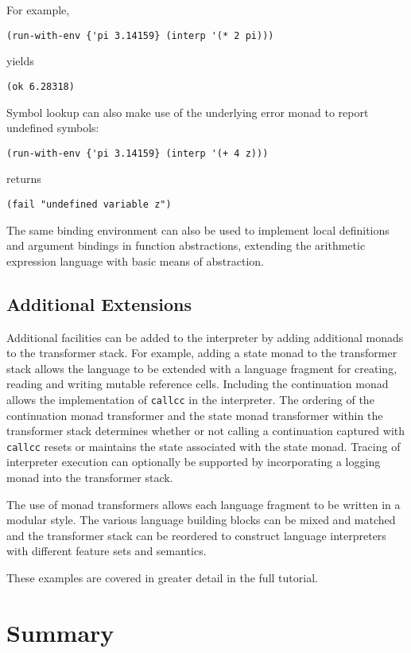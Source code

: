 \documentclass[natbib,10pt]{sigplanconf}
\begin{document}
\pagebreak

For example,
\begin{verbatim}
(run-with-env {'pi 3.14159} (interp '(* 2 pi)))
\end{verbatim}
yields
\begin{verbatim}
(ok 6.28318)
\end{verbatim}
Symbol lookup can also make use of the underlying error monad
to report undefined symbols:
\begin{verbatim}
(run-with-env {'pi 3.14159} (interp '(+ 4 z)))
\end{verbatim}
returns
\begin{verbatim}
(fail "undefined variable z")
\end{verbatim}

The same binding environment can also be used to implement local
definitions and argument bindings in function abstractions, extending
the arithmetic expression language with basic means of abstraction.

\subsection{Additional Extensions}

Additional facilities can be added to the interpreter by adding
additional monads to the transformer stack. For example, adding a
state monad to the transformer stack allows the language to be
extended with a language fragment for creating, reading and writing
mutable reference cells. Including the continuation monad allows the
implementation of {\tt callcc} in the interpreter.  The ordering of
the continuation monad transformer and the state monad transformer
within the transformer stack determines whether or not calling a
continuation captured with {\tt callcc} resets or maintains the
state associated with the state monad. Tracing of interpreter
execution can optionally be supported by incorporating a logging
monad into the transformer stack.

The use of monad transformers allows each language fragment to be
written in a modular style.  The various language building blocks can
be mixed and matched and the transformer stack can be reordered to
construct language interpreters with different feature sets and
semantics.

These examples are covered in greater detail in the full tutorial.

\section{Summary}
\end{document}

